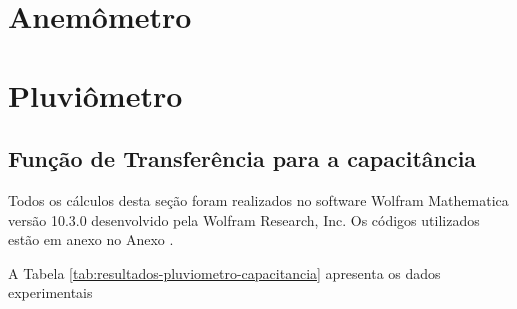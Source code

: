 \documentclass[a4paper]{instrumentacao}
\begin{document}

\section{Anemômetro}




\section{Pluviômetro}
\subsection{Função de Transferência para a capacitância}

Todos os cálculos desta seção foram realizados no software Wolfram Mathematica versão 10.3.0 desenvolvido pela Wolfram Research, Inc. Os códigos utilizados estão em anexo no Anexo .

A Tabela \ref{tab:resultados-pluviometro-capacitancia} apresenta os dados experimentais
\end{document}
